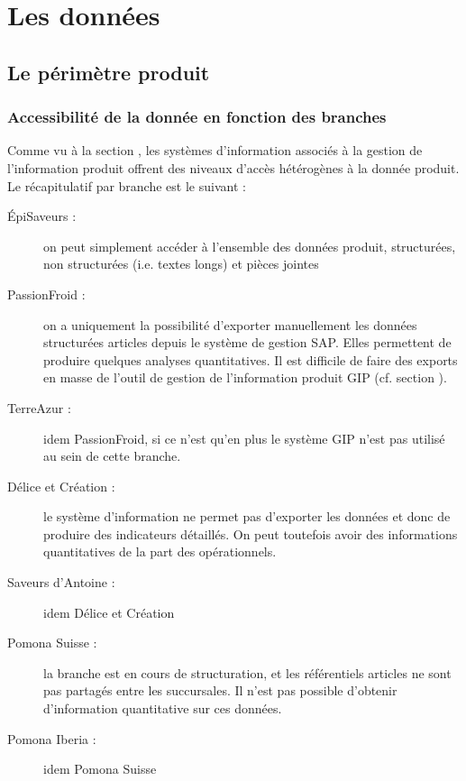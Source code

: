 \part{Les données}
    \chapter{Le périmètre produit}
    \label{perimetre_produit}
        \section{Accessibilité de la donnée en fonction des branches}

        Comme vu à la section , les systèmes d'information associés à la gestion de l'information produit offrent des niveaux d'accès hétérogènes à la donnée produit.
        Le récapitulatif par branche est le suivant : 
        \begin{description}
            \item[\'{E}piSaveurs :] on peut simplement accéder à l'ensemble des données produit, structurées, non structurées (i.e. textes longs) et pièces jointes
            \item[PassionFroid :] on a uniquement la possibilité d'exporter manuellement les données structurées articles depuis le système de gestion SAP.
            Elles permettent de produire quelques analyses quantitatives.
            Il est difficile de faire des exports en masse de l'outil de gestion de l'information produit GIP (cf. section ).
            \item[TerreAzur :] idem PassionFroid, si ce n'est qu'en plus le système GIP n'est pas utilisé au sein de cette branche.
            \item[Délice et Création :] le système d'information ne permet pas d'exporter les données et donc de produire des indicateurs détaillés. On peut toutefois avoir des informations quantitatives de la part des opérationnels.
            \item[Saveurs d'Antoine :] idem Délice et Création
            \item[Pomona Suisse :] la branche est en cours de structuration, et les référentiels articles ne sont pas partagés entre les succursales. Il n'est pas possible d'obtenir d'information quantitative sur ces données.
            \item[Pomona Iberia :] idem Pomona Suisse
        \end{description}

